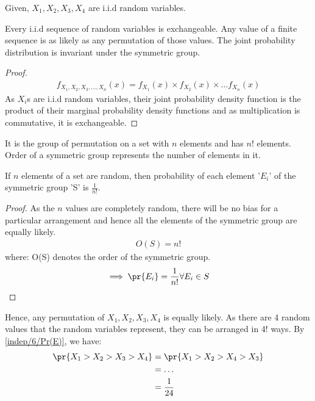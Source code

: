 Given, $X_1,X_2,X_3,X_4$ are i.i.d random variables.
\begin{lemma}
Every i.i.d sequence of random variables is exchangeable. 
Any value of a finite sequence is as likely as any permutation of those values. The joint probability distribution is invariant under the symmetric group.
\end{lemma}
\begin{proof}
\begin{align}
    f_{X_1,X_2,X_3,\dots,X_n}(x) = f_{X_1}(x) \times f_{X_2}(x) \times \dots f_{X_n}(x) 
\end{align}
As $X_i$s are i.i.d random variables, their joint probability density function is the product of their marginal probability density functions and as multiplication is commutative, it is exchangeable.
    
\end{proof}
\begin{definition}
It is the group of permutation on a set with $n$ elements and has $n!$ elements. Order of a symmetric group represents the number of elements in it.
\end{definition}
\begin{lemma}
If $n$ elements of a set are random, then probability of each element '$E_i$' of the symmetric group 'S' is $\frac{1}{n!}$.
\end{lemma}
\begin{proof}
As the $n$ values are completely random, there will be no bias for a particular arrangement and hence all the elements of the symmetric group are equally likely.
\begin{align}
    O(S) = n!
\end{align}
where: O(S) denotes the order of the symmetric group.
\begin{align}
\implies \pr{E_i} = \frac{1}{n!} \forall E_i \in S \label{indep/6/Pr(E)}
\end{align}
\end{proof}
Hence, any permutation of $X_1,X_2,X_3,X_4$ is equally likely.
As there are 4 random values that the random variables represent, they can be arranged in 4! ways. By \eqref{indep/6/Pr(E)}, we have:
\begin{align}
   \pr{X_1>X_2>X_3>X_4} &= \pr{X_1>X_2>X_4>X_3} \\&= \dots\\ &= \frac{1}{24}
\end{align}
